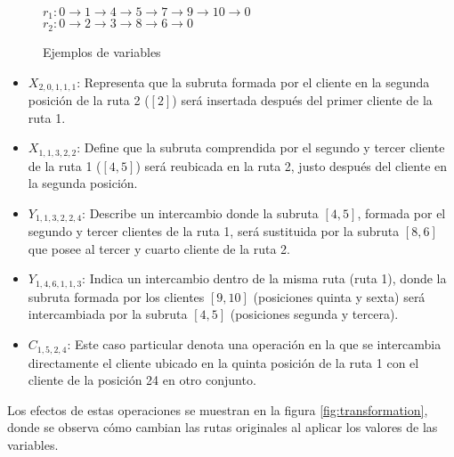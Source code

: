 \documentclass{article}
\begin{document}
\begin{figure}[h!]
    \vspace{0.5em}
$r_1:  0 \rightarrow 1\rightarrow 4 \rightarrow 5 \rightarrow 7 \rightarrow 9 \rightarrow 10 \rightarrow  0$\\
$r_2:  0\rightarrow 2\rightarrow 3\rightarrow 8 \rightarrow 6 \rightarrow  0$\\
\caption{Ejemplos de variables}
\label{fig:variables_example}
\end{figure}


\begin{itemize}
\item $X_{2,0,1,1,1}$: Representa que la subruta formada por el cliente en la segunda posición de la ruta 2 (\([2]\)) será insertada después del primer cliente de la ruta 1.
\item $X_{1,1,3,2,2}$: Define que la subruta comprendida por el segundo y tercer cliente de la ruta 1 (\([4,5]\)) será reubicada en la ruta 2, justo después del cliente en la segunda posición.  
\item $Y_{1,1,3,2,2,4}$: Describe un intercambio donde la subruta \([4,5]\), formada por el segundo y tercer clientes de la ruta 1, será sustituida por la subruta \([8,6]\) que posee al tercer y cuarto cliente de la ruta 2.  
\item $Y_{1,4,6,1,1,3}$: Indica un intercambio dentro de la misma ruta (ruta 1), donde la subruta formada por los clientes \([9,10]\) (posiciones quinta y sexta) será intercambiada por la subruta \([4,5]\) (posiciones segunda y tercera).  
\item $C_{1,5,2,4}$: Este caso particular denota una operación en la que se intercambia directamente el cliente ubicado en la quinta posición de la ruta 1 con el cliente de la posición 24 en otro conjunto.  
\end{itemize}

Los efectos de estas operaciones se muestran en la figura \ref{fig:transformation}, donde se observa cómo cambian las rutas originales al aplicar los valores de las variables.
\end{document}
